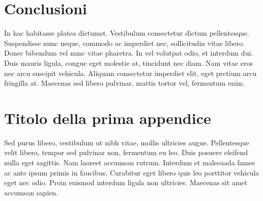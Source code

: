 \documentclass[target=bach,aauheader=,style=]{thud}
\begin{document}
\chapter{Conclusioni}
In hac habitasse platea dictumst. Vestibulum consectetur dictum pellentesque. Suspendisse nunc neque, commodo ac imperdiet nec, sollicitudin vitae libero. Donec bibendum vel nunc vitae pharetra. In vel volutpat odio, et interdum dui. Duis mauris ligula, congue eget molestie at, tincidunt nec diam. Nam vitae eros nec arcu suscipit vehicula. Aliquam consectetur imperdiet elit, eget pretium arcu fringilla at. Maecenas \cite{Knu86} sed libero pulvinar, mattis tortor vel, fermentum enim.

\appendix


\chapter{Titolo della prima appendice}
Sed purus libero, vestibulum ut nibh vitae, mollis ultricies augue. Pellentesque velit libero, tempor sed pulvinar non, fermentum eu leo. Duis posuere eleifend nulla eget sagittis. Nam laoreet accumsan rutrum. Interdum et malesuada fames ac ante ipsum primis in faucibus. Curabitur eget libero quis leo porttitor vehicula eget nec odio. Proin euismod interdum ligula non ultricies. Maecenas sit amet accumsan sapien.

\backmatter




\end{document}
